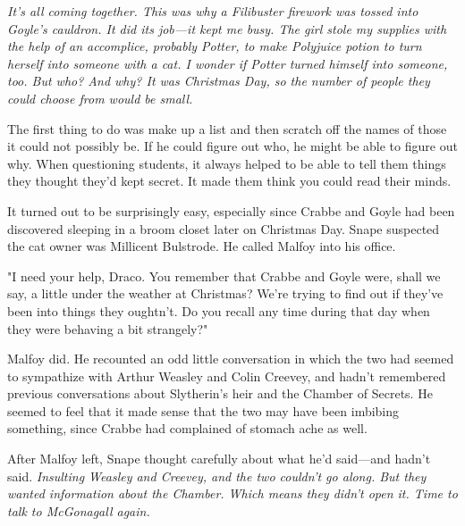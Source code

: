 \emph{It's all coming together. This was why a Filibuster firework was tossed into Goyle's cauldron. It did its job—it kept me busy. The girl stole my supplies with the help of an accomplice, probably Potter, to make Polyjuice potion to turn herself into someone with a cat. I wonder if Potter turned himself into someone, too. But who? And why? It was Christmas Day, so the number of people they could choose from would be small.}

The first thing to do was make up a list and then scratch off the names of those it could not possibly be. If he could figure out who, he might be able to figure out why. When questioning students, it always helped to be able to tell them things they thought they'd kept secret. It made them think you could read their minds.

It turned out to be surprisingly easy, especially since Crabbe and Goyle had been discovered sleeping in a broom closet later on Christmas Day. Snape suspected the cat owner was Millicent Bulstrode. He called Malfoy into his office.

"I need your help, Draco. You remember that Crabbe and Goyle were, shall we say, a little under the weather at Christmas? We're trying to find out if they've been into things they oughtn't. Do you recall any time during that day when they were behaving a bit{\el} strangely?"

Malfoy did. He recounted an odd little conversation in which the two had seemed to sympathize with Arthur Weasley and Colin Creevey, and hadn't remembered previous conversations about Slytherin's heir and the Chamber of Secrets. He seemed to feel that it made sense that the two may have been imbibing something, since Crabbe had complained of stomach ache as well.

After Malfoy left, Snape thought carefully about what he'd said—and hadn't said. \emph{Insulting Weasley and Creevey, and the two couldn't go along. But they wanted information about the Chamber. Which means they didn't open it. Time to talk to McGonagall again.}


